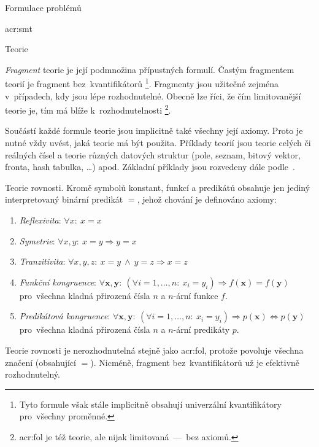 \documentclass[thesis=M,czech]{FITthesis}[2012/06/26]
\newcommand{\acrlabel}[1]{acr:#1}
\newcommand{\acr}[1]{\acrshort{\acrlabel{#1}}}
\newcommand{\acrf}[1]{\acrfull{\acrlabel{#1}}}
\newcommand{\hl}[1]{\textit{#1}}
\newcommand{\name}[1]{\hl{#1}}
\newcommand{\cit}[1]{\cite{#1}}
\renewcommand{\vec}[1]{\ensuremath{\boldsymbol{#1}}}
\begin{document}
\begin{section}{Formulace problémů}
\begin{subsection}{\acrf{smt}}
\begin{subsubsection}{Teorie}

\bigskip

\name{Fragment} teorie je její podmnožina přípustných formulí.
Častým fragmentem teorií
je fragment bez~kvantifikátorů%
\footnote{Tyto formule však stále implicitně obsahují
univerzální kvantifikátory pro~všechny proměnné.}.
Fragmenty jsou užitečné zejména v~případech,
kdy jsou lépe rozhodnutelné.
Obecně lze říci,
že čím limitovanější teorie je,
tím má blíže k~rozhodnutelnosti%
\footnote{\acr{fol} je též teorie,
ale nijak limitovaná~---~bez axiomů.}.

Součástí každé formule teorie
jsou implicitně také všechny její axiomy.
Proto je nutné vždy uvést, jaká teorie má být použita.
Příklady teorií jsou teorie celých či reálných čísel
a teorie různých datových struktur
(pole, seznam, bitový vektor, fronta, hash tabulka, \dots)
apod. Základní příklady jsou rozvedeny dále podle~\cit{theories-book}.


\begin{paragraph}{Teorie rovnosti.}
\label{p:theory:formulation:smt:theory:equal}
Kromě symbolů konstant, funkcí a predikátů
obsahuje jen jediný interpretovaný binární predikát $=$,
jehož chování je definováno axiomy:
\begin{enumerate}
\item \name{Reflexivita}:
   $\forall x : \: x = x$
\item \name{Symetrie}:
   $\forall x,y : \: x = y \Rightarrow y = x$
\item \name{Tranzitivita}:
   $\forall x,y,z : \: x = y \: \land \: y = z \Rightarrow x = z$
\item \name{Funkční kongruence}:
   $\forall \vec{x},\vec{y} : \:
      \left( \forall i = 1, \dots, n : \: x_i = y_i \right)
      \Rightarrow f(\vec{x}) = f(\vec{y})$ \\
   pro~všechna kladná přirozená čísla $n$ a $n$-ární funkce $f$.
\item \name{Predikátová kongruence}:
   $\forall \vec{x},\vec{y} : \:
      \left( \forall i = 1, \dots, n : \: x_i = y_i \right)
      \Rightarrow p(\vec{x}) \Leftrightarrow p(\vec{y})$ \\
   pro~všechna kladná přirozená čísla $n$ a $n$-ární predikáty $p$.
\end{enumerate}

Teorie rovnosti je nerozhodnutelná stejně jako \acr{fol},
protože povoluje všechna značení (obsahující $=$).
Nicméně, fragment bez~kvantifikátorů
už je efektivně rozhodnutelný.
\end{paragraph} %


\end{subsubsection}
\end{subsection}
\end{section}
\end{document}

